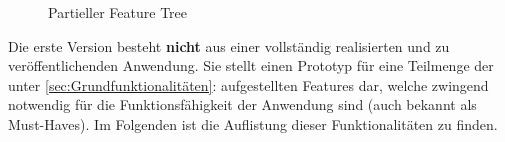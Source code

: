 \documentclass[paper=a4, parskip=half]{scrreprt}
\begin{document}
\begin{figure}[hbt!]
  \centering
  \vspace{-0.25cm}
  \caption[Partieller Feature Tree]{Partieller Feature Tree}
  \label{fig:FeatureTree}
\end{figure}

Die erste Version besteht \textbf{nicht} aus einer vollständig realisierten und zu veröffentlichenden Anwendung. Sie stellt einen Prototyp für eine Teilmenge der unter \ref{sec:Grundfunktionalitäten}:  aufgestellten Features dar, welche zwingend notwendig für die Funktionsfähigkeit der Anwendung sind (auch bekannt als Must-Haves). Im Folgenden ist die Auflistung dieser Funktionalitäten zu finden.
\end{document}
